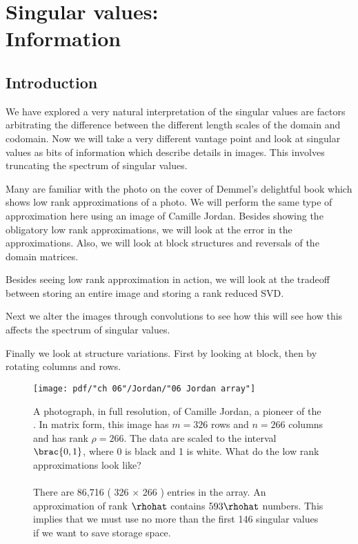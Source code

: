 \chapter[Singular values: Information]{Singular values:\\ Information}

\section{Introduction}
We have explored a very natural interpretation of the singular values are factors arbitrating the difference between the different length scales of the domain and codomain. Now we will take a very different vantage point and look at singular values as bits of information which describe details in images. This involves truncating the spectrum of singular values.

Many are familiar with the photo on the cover of Demmel's delightful book which shows low rank approximations of a photo. We will perform the same type of approximation here using an image of Camille Jordan. Besides showing the obligatory low rank approximations, we will look at the error in the approximations. Also, we will look at block structures and reversals of the domain matrices.

Besides seeing low rank approximation in action, we will look at the tradeoff between storing an entire image and storing a rank reduced SVD.

Next we alter the images through convolutions to see how this will see how this affects the spectrum of singular values.

Finally we look at structure variations. First by looking at block, then by rotating columns and rows.

\begin{figure}[h!] %
   \centering
   \texttt{[image: pdf/"ch 06"/Jordan/"06 Jordan array"]} 
   \caption[A photograph of Camille Jordan]{A photograph, in full resolution, of Camille Jordan, a pioneer of the \svdl. In matrix form, this image has $m=326$ rows and $n=266$ columns and has rank $\rho = 266$. The data are scaled to the interval $\brac{0,1}$, where 0 is black and 1 is white. What do the low rank approximations look like? \\ \ \\ There are 86,716 ( 326 $\times$ 266 ) entries in the array. An approximation of rank $\rhohat$ contains $593 \rhohat$ numbers. This implies that we must use no more than the first 146 singular values if we want to save storage space.}
   \label{fig:06:Camille}
\end{figure}

\clearpage
%







%

\endinput